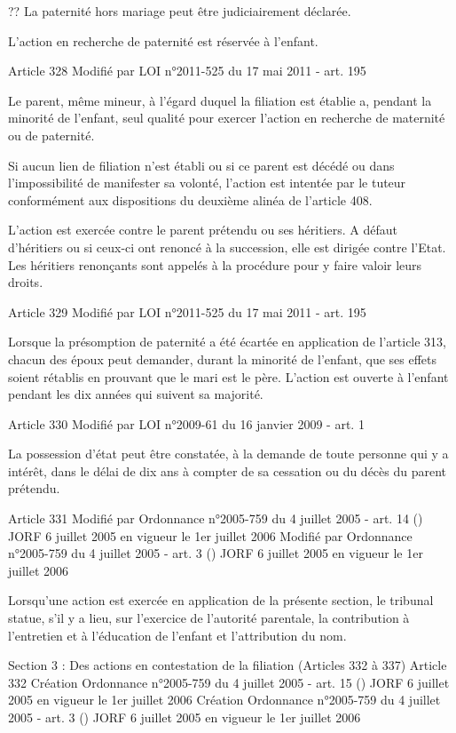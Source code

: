 \documentclass[
  12pt,
]{book}
\begin{document}
\begin{encadre}{??}
La paternité hors mariage peut être judiciairement déclarée.

L'action en recherche de paternité est réservée à l'enfant.

Article 328
Modifié par LOI n°2011-525 du 17 mai 2011 - art. 195

Le parent, même mineur, à l'égard duquel la filiation est établie a, pendant la minorité de l'enfant, seul qualité pour exercer l'action en recherche de maternité ou de paternité.

Si aucun lien de filiation n'est établi ou si ce parent est décédé ou dans l'impossibilité de manifester sa volonté, l'action est intentée par le tuteur conformément aux dispositions du deuxième alinéa de l'article 408.

L'action est exercée contre le parent prétendu ou ses héritiers. A défaut d'héritiers ou si ceux-ci ont renoncé à la succession, elle est dirigée contre l'Etat. Les héritiers renonçants sont appelés à la procédure pour y faire valoir leurs droits.

Article 329
Modifié par LOI n°2011-525 du 17 mai 2011 - art. 195

Lorsque la présomption de paternité a été écartée en application de l'article 313, chacun des époux peut demander, durant la minorité de l'enfant, que ses effets soient rétablis en prouvant que le mari est le père. L'action est ouverte à l'enfant pendant les dix années qui suivent sa majorité.

Article 330
Modifié par LOI n°2009-61 du 16 janvier 2009 - art. 1

La possession d'état peut être constatée, à la demande de toute personne qui y a intérêt, dans le délai de dix ans à compter de sa cessation ou du décès du parent prétendu.

Article 331
Modifié par Ordonnance n°2005-759 du 4 juillet 2005 - art. 14 () JORF 6 juillet 2005 en vigueur le 1er juillet 2006
Modifié par Ordonnance n°2005-759 du 4 juillet 2005 - art. 3 () JORF 6 juillet 2005 en vigueur le 1er juillet 2006

Lorsqu'une action est exercée en application de la présente section, le tribunal statue, s'il y a lieu, sur l'exercice de l'autorité parentale, la contribution à l'entretien et à l'éducation de l'enfant et l'attribution du nom.

Section 3 : Des actions en contestation de la filiation (Articles 332 à 337)
Article 332
Création Ordonnance n°2005-759 du 4 juillet 2005 - art. 15 () JORF 6 juillet 2005 en vigueur le 1er juillet 2006
Création Ordonnance n°2005-759 du 4 juillet 2005 - art. 3 () JORF 6 juillet 2005 en vigueur le 1er juillet 2006


\end{encadre}
\end{document}
